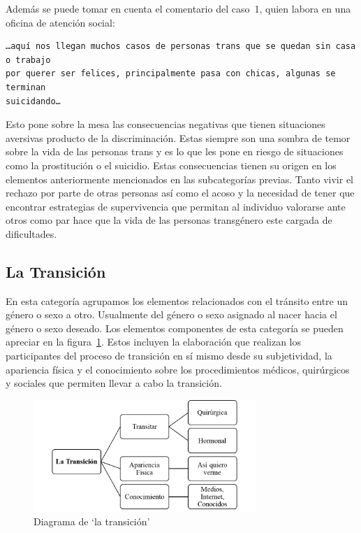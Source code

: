 Además se puede tomar en cuenta el comentario del caso~1, quien labora en una
oficina de atención social:

\begin{verbatim}
…aquí nos llegan muchos casos de personas trans que se quedan sin casa o trabajo
por querer ser felices, principalmente pasa con chicas, algunas se terminan
suicidando…
\end{verbatim}

 Esto pone sobre la mesa las consecuencias negativas que tienen situaciones
 aversivas producto de la discriminación. Estas siempre son una sombra de temor
 sobre la vida de las personas trans y es lo que les pone en riesgo de
 situaciones como la prostitución o el suicidio. Estas consecuencias tienen su
 origen en los elementos anteriormente mencionados en las subcategorías previas.
 Tanto vivir el rechazo por parte de otras personas así como el acoso y la
 necesidad de tener que encontrar estrategias de supervivencia que permitan al
 individuo valorarse ante otros como par hace que la vida de las personas
 transgénero este cargada de dificultades.

\subsection{La Transición}

En esta categoría agrupamos los elementos relacionados con el tránsito entre un
género o sexo a otro. Usualmente del género o sexo asignado al nacer hacia el
género o sexo deseado. Los elementos componentes de esta categoría se pueden
apreciar en la figura~\ref{fig:transicion}. Estos incluyen la elaboración que
realizan los participantes del proceso de transición en sí mismo desde su
subjetividad, la apariencia física y el conocimiento sobre los procedimientos
médicos, quirúrgicos y sociales que permiten llevar a cabo la transición.

\begin{figure}
    \centering
    \includegraphics[width=0.75\textwidth]{transicion}
    \caption{Diagrama de ‘la transición’}\label{fig:transicion}
\end{figure}

